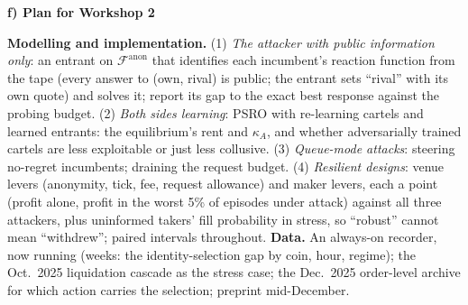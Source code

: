 \documentclass[10pt]{article}
\newcommand{\Fanon}{\mathcal{F}^{\mathrm{anon}}}
\newcommand{\sect}[1]{\par\vspace{5pt}\noindent\textbf{#1}\par\vspace{1.5pt}\noindent}
\begin{document}
\sect{f) Plan for Workshop 2}
\textbf{Modelling and implementation.} (1) \emph{The attacker with public information only}: an entrant on $\Fanon$ that identifies each incumbent's reaction function from the tape (every answer to (own, rival) is public; the entrant sets ``rival'' with its own quote) and solves it; report its gap to the exact best response against the probing budget. (2) \emph{Both sides learning}: PSRO with re-learning cartels and learned entrants: the equilibrium's rent and $\kappa_A$, and whether adversarially trained cartels are less exploitable or just less collusive. (3) \emph{Queue-mode attacks}: steering no-regret incumbents; draining the request budget. (4) \emph{Resilient designs}: venue levers (anonymity, tick, fee, request allowance) and maker levers, each a point (profit alone, profit in the worst 5\% of episodes under attack) against all three attackers, plus uninformed takers' fill probability in stress, so ``robust'' cannot mean ``withdrew''; paired intervals throughout. \textbf{Data.} An always-on recorder, now running (weeks: the identity-selection gap by coin, hour, regime); the Oct.\ 2025 liquidation cascade as the stress case; the Dec.\ 2025 order-level archive for which action carries the selection; preprint mid-December.
\end{document}
